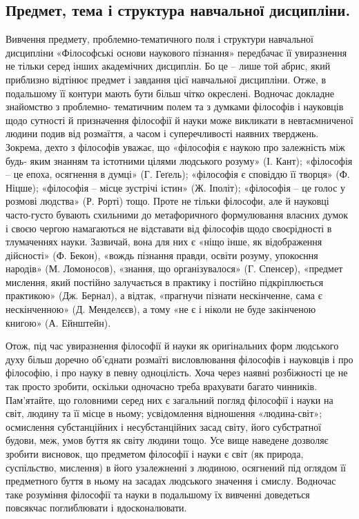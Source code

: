 \subsection{Предмет, тема і структура навчальної дисципліни.} Вивчення предмету,
проблемно-тематичного поля і структури навчальної дисципліни «Філософські
основи наукового пізнання» передбачає її увиразнення не тільки серед інших
академічних дисциплін. Бо це – лише той абрис, який приблизно відтінює
предмет і завдання цієї навчальної дисципліни. Отже, в подальшому її контури
мають бути більш чітко окреслені. Водночас докладне знайомство з проблемно-
тематичним полем та з думками філософів і науковців щодо сутності й
призначення філософії й науки може викликати в невтаємниченої людини
подив від розмаїття, а часом і суперечливості наявних тверджень. Зокрема,
дехто з філософів уважає, що «філософія є наукою про залежність між будь-
яким знанням та істотними цілями людського розуму» (І. Кант); «філософія –
це епоха, осягнення в думці» (Г. Геґель); «філософія є сповіддю її творця» (Ф.
Ніцше); «філософія – місце зустрічі істин» (Ж. Іполіт); «філософія – це голос у
розмові людства» (Р. Рорті) тощо. Проте не тільки філософи, але й науковці
часто-густо бувають схильними до метафоричного формулювання власних
думок і своєю чергою намагаються не відставати від філософів щодо
своєрідності в тлумаченнях науки. Зазвичай, вона для них є «ніщо інше, як
відображення дійсності» (Ф. Бекон), «вождь пізнання правди, освіти розуму,
упокоєння народів» (М. Ломоносов), «знання, що організувалося» (Г. Спенсер),
«предмет мислення, який постійно залучається в практику і постійно
підкріплюється практикою» (Дж. Бернал), а відтак, «прагнучи пізнати
нескінченне, сама є нескінченною» (Д. Менделєєв), а тому «не є і ніколи не
буде закінченою книгою» (А. Ейнштейн).

Отож, під час увиразнення філософії й науки як оригінальних форм
людського духу більш доречно об’єднати розмаїті висловлювання філософів і
науковців і про філософію, і про науку в певну одноцілість. Хоча через наявні
розбіжності це не так просто зробити, оскільки одночасно треба врахувати
багато чинників. Пам’ятайте, що головними серед них є загальний погляд
філософії і науки на світ, людину та її місце в ньому; усвідомлення відношення
«людина-світ»; осмислення субстанційних і несубстанційних засад світу, його
субстратної будови, меж, умов буття як світу людини тощо. Усе вище наведене
дозволяє зробити висновок, що предметом філософії і науки є світ (як природа,
суспільство, мислення) в його узалежненні з людиною, осягнений під оглядом її
предметного буття в ньому на засадах людського значення і смислу. Водночас
таке розуміння філософії та науки в подальшому їх вивченні доведеться
повсякчас поглиблювати і вдосконалювати.

